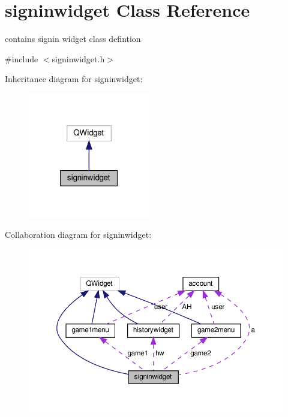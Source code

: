 \hypertarget{classsigninwidget}{}\section{signinwidget Class Reference}
\label{classsigninwidget}


contains signin widget class defintion  




{\ttfamily \#include $<$signinwidget.\+h$>$}



Inheritance diagram for signinwidget\+:\nopagebreak
\begin{figure}[H]
\begin{center}
\leavevmode
\includegraphics[width=151pt]{classsigninwidget__inherit__graph}
\end{center}
\end{figure}


Collaboration diagram for signinwidget\+:\nopagebreak
\begin{figure}[H]
\begin{center}
\leavevmode
\includegraphics[width=350pt]{classsigninwidget__coll__graph}
\end{center}
\end{figure}
